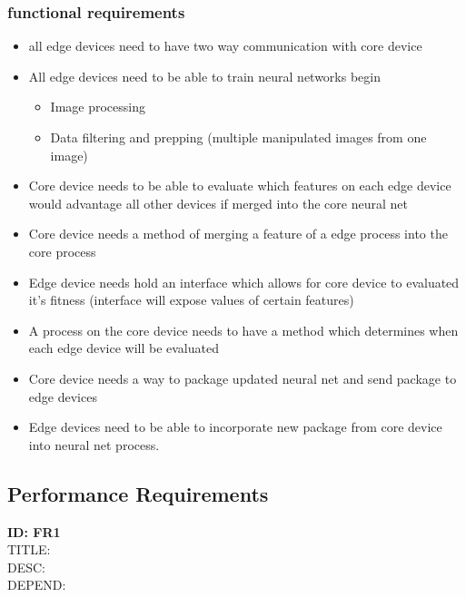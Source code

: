 \documentclass[onecolumn, draftclsnofoot,10pt, compsoc]{IEEEtran}
\begin{document}
	\subsubsection{functional requirements}
	\begin{itemize}
		\item all edge devices need to have two way communication with core device
		\item All edge devices need to be able to train neural networks
		begin\begin{itemize}
			\item Image processing
			\item Data filtering and prepping (multiple manipulated images from one image)
		\end{itemize}
		\item Core device needs to be able to evaluate which features on each edge device would advantage all other devices if merged into the core neural net
		\item Core device needs a method of merging a feature of a edge process into the core process
		\item Edge device needs hold an interface which allows for core device to evaluated it's fitness (interface will expose values of certain features)
		\item A process on the core device needs to have a method which determines when each edge device will be evaluated
		\item Core device needs a way to package updated neural net and send package to edge devices
		\item Edge devices need to be able to incorporate new package from core device into neural net process.
		
		
	\end{itemize}


	\subsection{Performance Requirements}
\textbf{ID: FR1} \\
	TITLE: \\
	DESC: \\
	DEPEND: \\

	\newpage
\end{document}
